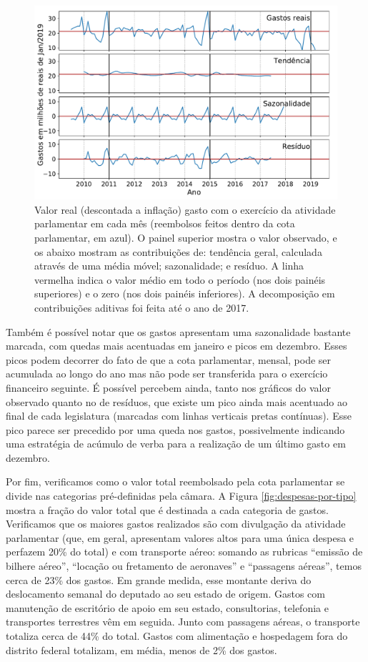 \documentclass[12pt,a4paper]{article}
\begin{document}
\begin{figure}[t]
\centering
\includegraphics[width=1.0\textwidth]{graficos/despesas-reais-e-sazonalidade_2019-04-29.pdf}
\caption{Valor real (descontada a inflação) gasto com o exercício da atividade parlamentar em cada mês
  (reembolsos feitos dentro da cota parlamentar, em azul). O painel superior mostra o valor observado, e os
  abaixo mostram as contribuições de: tendência geral, calculada através de uma média móvel; sazonalidade; e resíduo.
  A linha vermelha indica o valor médio em todo o período (nos dois painéis superiores) e o zero (nos dois
  painéis inferiores). A decomposição em contribuições aditivas foi feita até o ano de 2017.}
\label{fig:total-despesas-por-mes}
\end{figure} 

Também é possível notar que os gastos apresentam uma sazonalidade bastante marcada, com quedas mais
acentuadas em janeiro e picos em dezembro. Esses picos podem decorrer do fato de que a cota parlamentar, mensal,
pode ser acumulada ao longo do ano mas não pode ser transferida para o exercício financeiro seguinte.
É possível percebem ainda, tanto nos gráficos do valor observado quanto no de resíduos, que existe
um pico ainda mais acentuado ao final de cada legislatura (marcadas com linhas verticais pretas contínuas).
Esse pico parece ser precedido por uma queda nos gastos, possivelmente indicando uma estratégia de acúmulo de verba
para a realização de um último gasto em dezembro.

Por fim, verificamos como o valor total reembolsado pela cota parlamentar se divide nas categorias pré-definidas
pela câmara. A Figura \ref{fig:despesas-por-tipo} mostra a fração do valor total que é destinada a cada categoria
de gastos. Verificamos que os maiores gastos realizados são com divulgação da atividade parlamentar (que, em geral,
apresentam valores altos para uma única despesa e perfazem 20\% do total) e com transporte aéreo: somando as rubricas
``emissão de bilhere aéreo'', ``locação ou fretamento de aeronaves'' e ``passagens aéreas'', temos cerca de
23\% dos gastos. Em grande medida, esse montante deriva do deslocamento semanal do deputado ao seu estado de origem.
Gastos com manutenção de escritório de apoio em seu estado, consultorias, telefonia e transportes terrestres vêm
em seguida. Junto com passagens aéreas, o transporte totaliza cerca de 44\% do total. Gastos com alimentação e
hospedagem fora do distrito federal totalizam, em média, menos de 2\% dos gastos.
\end{document}
